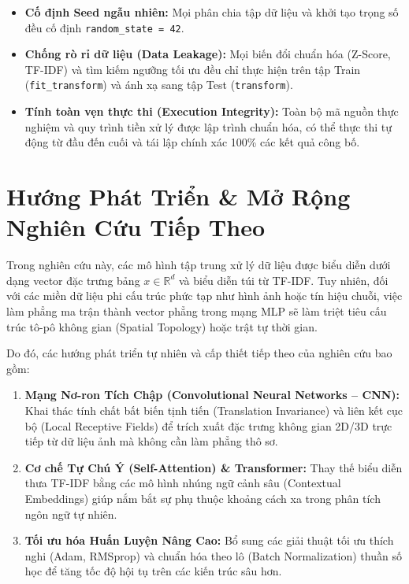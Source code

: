 \documentclass[12pt,a4paper]{report}
\begin{document}
\begin{itemize}[leftmargin=2em]
\begin{itemize}
    \end{itemize}
    \item \textbf{Cố định Seed ngẫu nhiên:} Mọi phân chia tập dữ liệu và khởi tạo trọng số đều cố định \texttt{random\_state = 42}.
    \item \textbf{Chống rò rỉ dữ liệu (Data Leakage):} Mọi biến đổi chuẩn hóa (Z-Score, TF-IDF) và tìm kiếm ngưỡng tối ưu đều chỉ thực hiện trên tập Train (\texttt{fit\_transform}) và ánh xạ sang tập Test (\texttt{transform}).
    \item \textbf{Tính toàn vẹn thực thi (Execution Integrity):} Toàn bộ mã nguồn thực nghiệm và quy trình tiền xử lý được lập trình chuẩn hóa, có thể thực thi tự động từ đầu đến cuối và tái lập chính xác 100\% các kết quả công bố.
\end{itemize}

\section{Hướng Phát Triển \& Mở Rộng Nghiên Cứu Tiếp Theo}
Trong nghiên cứu này, các mô hình tập trung xử lý dữ liệu được biểu diễn dưới dạng vector đặc trưng bảng $x \in \mathbb{R}^d$ và biểu diễn túi từ TF-IDF. Tuy nhiên, đối với các miền dữ liệu phi cấu trúc phức tạp như hình ảnh hoặc tín hiệu chuỗi, việc làm phẳng ma trận thành vector phẳng trong mạng MLP sẽ làm triệt tiêu cấu trúc tô-pô không gian (Spatial Topology) hoặc trật tự thời gian. 

Do đó, các hướng phát triển tự nhiên và cấp thiết tiếp theo của nghiên cứu bao gồm:
\begin{enumerate}
    \item \textbf{Mạng Nơ-ron Tích Chập (Convolutional Neural Networks -- CNN):} Khai thác tính chất bất biến tịnh tiến (Translation Invariance) và liên kết cục bộ (Local Receptive Fields) để trích xuất đặc trưng không gian 2D/3D trực tiếp từ dữ liệu ảnh mà không cần làm phẳng thô sơ.
    \item \textbf{Cơ chế Tự Chú Ý (Self-Attention) \& Transformer:} Thay thế biểu diễn thưa TF-IDF bằng các mô hình nhúng ngữ cảnh sâu (Contextual Embeddings) giúp nắm bắt sự phụ thuộc khoảng cách xa trong phân tích ngôn ngữ tự nhiên.
    \item \textbf{Tối ưu hóa Huấn Luyện Nâng Cao:} Bổ sung các giải thuật tối ưu thích nghi (Adam, RMSprop) và chuẩn hóa theo lô (Batch Normalization) thuần số học để tăng tốc độ hội tụ trên các kiến trúc sâu hơn.
\end{enumerate}
\end{document}
